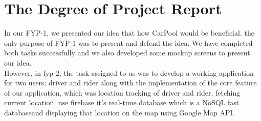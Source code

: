 \section{The Degree of Project Report}
In our FYP-1, we presented our idea that how CarPool would be beneficial. the only purpose of FYP-1 was to present and defend the idea. We have completed both tasks successfully and we also developed some mockup screens to present our idea.
\\ However, in fyp-2, the task assigned to us was to develop a working application for two users: driver and rider along with the implementation of the core feature of our application, which was location tracking of driver and rider, fetching current location, use firebase it’s real-time database which is a NoSQL fast databaseand displaying that location on the map using Google Map API.
